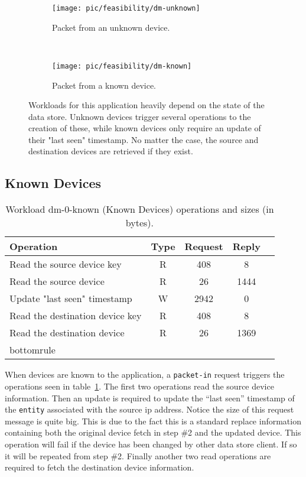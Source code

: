 \begin{figure}
  \centering
  \begin{subfigure}[b]{0.5\textwidth}
                \centering
                \texttt{[image: pic/feasibility/dm-unknown]}
                \caption{Packet from an unknown device.}
                \label{fig:dm:interaction:unknown}
        \end{subfigure}%
        ~
        \begin{subfigure}[b]{0.5\textwidth}
                \centering
                \texttt{[image: pic/feasibility/dm-known]}
                \caption{Packet from a known device.}
                \label{fig:dm:interaction:known}
        \end{subfigure}
        \caption[Device Manager workload events]{Workloads for this application heavily depend on the state of the data store. Unknown devices trigger several operations to the creation of these, while known devices only require an update of their "last seen" timestamp. No matter the case, the source and destination devices are retrieved if they exist.}
        \label{fig:dm:interaction}
\end{figure}

\subsection{Known Devices}

\begin{table}[ht]
\small
\centering 
\begin{tabular}{l c c c c}
Operation & Type & Request & Reply \\ \toprule 
Read the source device key & R & 408 & 8\\
Read the source device & R & 26 & 1444\\
Update "last seen" timestamp & W & 2942 & 0\\
Read the destination device key & R & 408 & 8\\
Read the destination device & R & 26 & 1369 \\bottomrule 
\end{tabular}
\caption[Workload dm-0-known (Known Devices) operations]{Workload
  dm-0-known (Known Devices) operations and sizes (in bytes).}
\label{table:ops:dm-0-known}
\end{table}

When devices are known to the application, a \texttt{packet-in} request
triggers the operations seen in table~\ref{table:ops:dm-0-known}. The
first two operations read the source device information. 
Then an update is required to update the ``last seen'' timestamp of the \texttt{entity} associated with the source \gls{ip} address. Notice the size of this request message is quite big. This is due to the fact this is a standard replace information containing both the original device fetch in step \#2 and the updated device. 
This operation will fail if the device has been changed by other data store client. If so it will be repeated from step \#2. 
Finally another two read operations are required to fetch the destination device information. 

